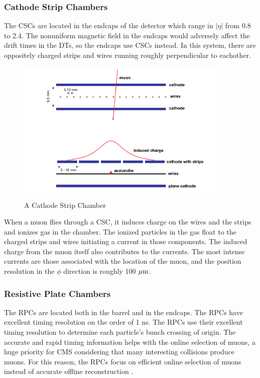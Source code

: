 \FloatBarrier
\subsubsection{Cathode Strip Chambers}

The CSCs are located in the endcaps of the detector which range in $|\eta|$ from 0.8 to 2.4. The nonuniform magnetic field in the endcaps would adversely affect the drift times in the DTs, so the endcaps use CSCs instead. In this system, there are oppositely charged strips and wires running roughly perpendicular to eachother.

\begin{figure}[h!]
  \centering
  \includegraphics[width=4in]{images/CSC.png}
  \caption
   {A Cathode Strip Chamber \cite{mutdr}}
  \label{fig:csc}
\end{figure}
When a muon flies through a CSC, it induces charge on the wires and the strips and ionizes gas in the chamber. The ionized particles in the gas float to the charged strips and wires initiating a current in those components. The induced charge from the muon itself also contributes to the currents. The most intense currents are those associated with the location of the muon, and the position resolution in the $\phi$ direction is roughly 100 ${\rm \mu m}$.

\FloatBarrier
\subsubsection{Resistive Plate Chambers}

The RPCs are located both in the barrel and in the endcaps. The RPCs have excellent timing resolution on the order of 1 ns. The RPCs use their excellent timing resolution to determine each particle's bunch crossing of origin. The accurate and rapid timing information helps with the online selection of muons, a huge priority for CMS considering that many interesting collisions produce muons. For this reason, the RPCs focus on efficient online selection of muons instead of accurate offline reconstruction \cite{cmsexp}.

